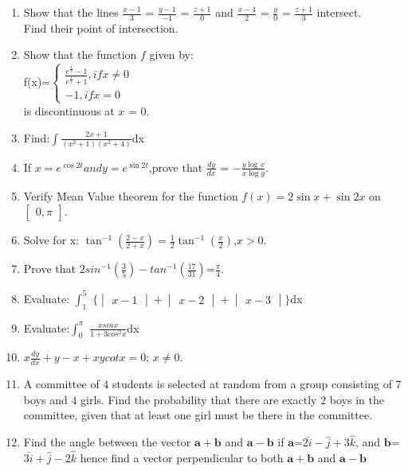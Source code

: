 \documentclass[12pt,-letter paper]{article}
\let\vec\mathbf{}
\let\vec\mathbf{}
\let\vec\mathbf{}
\providecommand{\mydet}[1]{\ensuremath{\begin{vmatrix}#1\end{vmatrix}}}
\providecommand{\myvec}[1]{\ensuremath{\begin{bmatrix}#1\end{bmatrix}}}
\providecommand{\brak}[1]{\ensuremath{\left(#1\right)}}
\begin{document}
\begin{enumerate}
    \item Show that the lines $\frac {x-1} {3} $ = $\frac {y-1} {-1} $ = $\frac {z+1} {0} $ and $\frac {x-4} {2} $ = $\frac {y} {0} $ = $\frac {z+1} {3} $ intersect.\\Find their point of intersection.
	
     \item Show that the function $f$ given by: \\
f(x)=$\begin{cases}\frac{e^{\frac{1}{x}}-1}{e^{\frac{1}{x}}+1}, if x\neq0\\    {-1}, if x = 0 \end{cases}$ \\is discontinuous at $x$ = $0$.

\item Find:$\int  \frac {2x+1} {\brak{x^2+1} \brak{x^2+4}}$dx

     \item If $ x = e^{\cos2t} and   y = e^{\sin2t} $,prove that $ \frac {dy} {dx} $ = $ -\frac{y \log x} {x \log y}	$. 
     \item Verify Mean Value theorem for the function $f\brak{x}=2\sin x+\sin 2x$ on $\myvec{0,\pi} $.
	

     \item Solve for x: $\tan^{-1} \brak{\frac {2 - x}{2 + x}} = \frac {1}{2} \tan^{-1}\brak{\frac {x}{2}}$,$x > 0$. 
      \item Prove that $2sin^{-1}\brak{\frac{3}{5}}-tan^{-1}\brak{\frac{17}{31}}$=$\frac{\pi}{4}$.

      \item Evaluate: $\int_{1}^{5}$ $\{{\mydet{x - 1} + \mydet{x - 2} + \mydet{x - 3}}\}$dx 
      \item Evaluate:$\int_{0}^{\pi}$ $ \frac {xsinx} {1+3cos^2x} $dx	     

      \item  $x\frac {dy} {dx}  + y - x + xycotx=0$; $x\neq0$.
	      
      \item  A committee of $4$ students is selected at random from a group consisting of $7$ boys and $4$ girls. Find the probability that there are exactly $2$ boys in the committee, given that at least one girl must be there in the committee.

      \item Find the angle between the vector $\vec{a}+\vec{b}$ and $\vec{a}-\vec{b}$ if $\vec{a}$=$2\hat{i}-\hat{j}+3\hat{k}$, and $\vec{b}$=$3\hat{i}+\hat{j}-2\hat{k}$ hence find a vector perpendicular to both $\vec{a}+\vec{b}$ and $\vec{a}-\vec{b}$


\end{enumerate}
\end{document}
